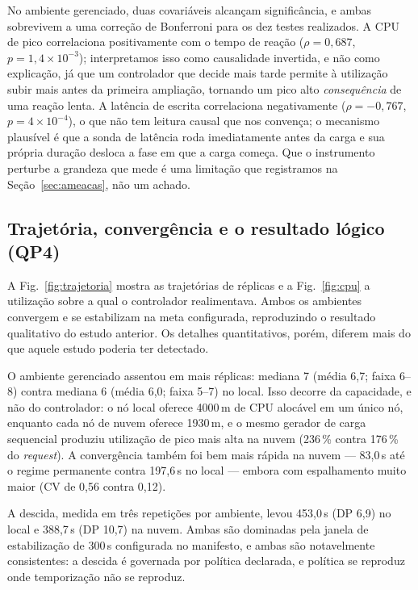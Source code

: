 \documentclass[conference]{IEEEtran}
\begin{document}
No ambiente gerenciado, duas covariáveis alcançam significância, e ambas
sobrevivem a uma correção de Bonferroni para os dez testes realizados. A CPU de
pico correlaciona positivamente com o tempo de reação ($\rho=0{,}687$,
$p=1{,}4\times10^{-3}$); interpretamos isso como causalidade invertida, e não
como explicação, já que um controlador que decide mais tarde permite à utilização
subir mais antes da primeira ampliação, tornando um pico alto
\emph{consequência} de uma reação lenta. A latência de escrita correlaciona
negativamente ($\rho=-0{,}767$, $p=4\times10^{-4}$), o que não tem leitura causal
que nos convença; o mecanismo plausível é que a sonda de latência roda
imediatamente antes da carga e sua própria duração desloca a fase em que a carga
começa. Que o instrumento perturbe a grandeza que mede é uma limitação que
registramos na Seção~\ref{sec:ameacas}, não um achado.

\subsection{Trajetória, convergência e o resultado lógico (QP4)}

A Fig.~\ref{fig:trajetoria} mostra as trajetórias de réplicas e a
Fig.~\ref{fig:cpu} a utilização sobre a qual o controlador realimentava. Ambos
os ambientes convergem e se estabilizam na meta configurada, reproduzindo o
resultado qualitativo do estudo anterior. Os detalhes quantitativos, porém,
diferem mais do que aquele estudo poderia ter detectado.

O ambiente gerenciado assentou em mais réplicas: mediana 7 (média 6,7; faixa
6--8) contra mediana 6 (média 6,0; faixa 5--7) no local. Isso decorre da
capacidade, e não do controlador: o nó local oferece 4000\,m de CPU alocável em
um único nó, enquanto cada nó de nuvem oferece 1930\,m, e o mesmo gerador de
carga sequencial produziu utilização de pico mais alta na nuvem (236\,\% contra
176\,\% do \emph{request}). A convergência também foi bem mais rápida na nuvem
--- 83,0\,s até o regime permanente contra 197,6\,s no local --- embora com
espalhamento muito maior (CV de 0,56 contra 0,12).

A descida, medida em três repetições por ambiente, levou 453,0\,s (DP 6,9) no
local e 388,7\,s (DP 10,7) na nuvem. Ambas são dominadas pela janela de
estabilização de 300\,s configurada no manifesto, e ambas são notavelmente
consistentes: a descida é governada por política declarada, e política se
reproduz onde temporização não se reproduz.
\end{document}
